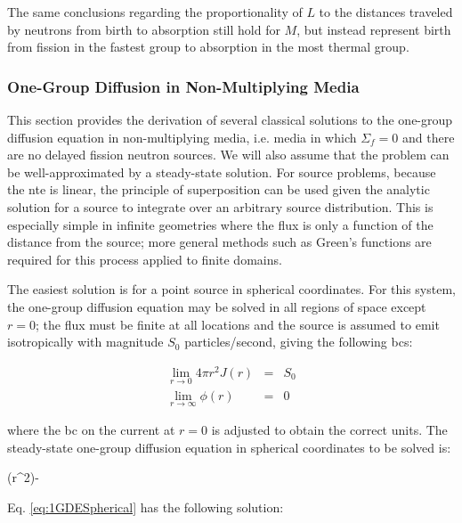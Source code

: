 The same conclusions regarding the proportionality of \(L\) to the distances traveled by neutrons from birth to absorption still hold for \(M\), but instead represent birth from fission in the fastest group to absorption in the most thermal group.

\subsubsection{One-Group Diffusion in Non-Multiplying Media}
\label{sec:NonMultiplyingDiffusion}
This section provides the derivation of several classical solutions to the one-group diffusion equation in non-multiplying media, i.e. media in which \(\Sigma_f=0\) and there are no delayed fission neutron sources. We will also assume that the problem can be well-approximated by a steady-state solution. For source problems, because the \gls{nte} is linear, the principle of superposition can be used given the analytic solution for a source to integrate over an arbitrary source distribution. This is especially simple in infinite geometries where the flux is only a function of the distance from the source; more general methods such as Green's functions are required for this process applied to finite domains.

\label{sec:1GDEPtSrcSpherical}
The easiest solution is for a point source in spherical coordinates. For this system, the one-group diffusion equation may be solved in all regions of space except \(r=0\); the flux must be finite at all locations and the source is assumed to emit isotropically with magnitude \(S_0\) particles/second, giving the following \glspl{bc}:

\begin{subequations}
\label{eq:1GDESphericalBCs}
\begin{eqnarray}
\lim_{r\rightarrow 0}4\pi r^2J(r)&=&S_0\\
\lim_{r\rightarrow\infty}\phi(r)&=&0
\end{eqnarray}
\end{subequations}

where the \gls{bc} on the current at \(r=0\) is adjusted to obtain the correct units. The steady-state one-group diffusion equation in spherical coordinates to be solved is:

\beq
\label{eq:1GDESpherical}
\left(r^2\right)-
\eeq

Eq. \eqref{eq:1GDESpherical} has the following solution:

